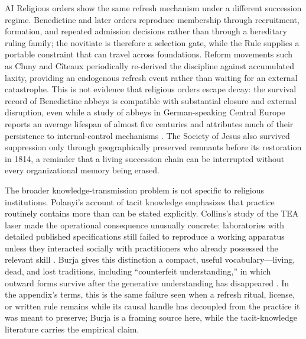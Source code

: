 \begin{refsection}
\begin{authbar}{AI}
Religious orders show the same refresh mechanism under a different succession regime. Benedictine and later orders reproduce membership through recruitment, formation, and repeated admission decisions rather than through a hereditary ruling family; the novitiate is therefore a selection gate, while the Rule supplies a portable constraint that can travel across foundations. Reform movements such as Cluny and Cîteaux periodically re-derived the discipline against accumulated laxity, providing an endogenous refresh event rather than waiting for an external catastrophe. This is not evidence that religious orders escape decay: the survival record of Benedictine abbeys is compatible with substantial closure and external disruption, even while a study of abbeys in German-speaking Central Europe reports an average lifespan of almost five centuries and attributes much of their persistence to internal-control mechanisms \autocite{rost2010benedictine}. The Society of Jesus also survived suppression only through geographically preserved remnants before its restoration in 1814, a reminder that a living succession chain can be interrupted without every organizational memory being erased.

The broader knowledge-transmission problem is not specific to religious institutions. Polanyi's account of tacit knowledge emphasizes that practice routinely contains more than can be stated explicitly. Collins's study of the TEA laser made the operational consequence unusually concrete: laboratories with detailed published specifications still failed to reproduce a working apparatus unless they interacted socially with practitioners who already possessed the relevant skill \autocite{polanyi1966tacit,collins1974teaset}. Burja gives this distinction a compact, useful vocabulary---living, dead, and lost traditions, including ``counterfeit understanding,'' in which outward forms survive after the generative understanding has disappeared \autocite{burja2018knowledge}. In the appendix's terms, this is the same failure seen when a refresh ritual, license, or written rule remains while its causal handle has decoupled from the practice it was meant to preserve; Burja is a framing source here, while the tacit-knowledge literature carries the empirical claim.


\end{authbar}
\end{refsection}
